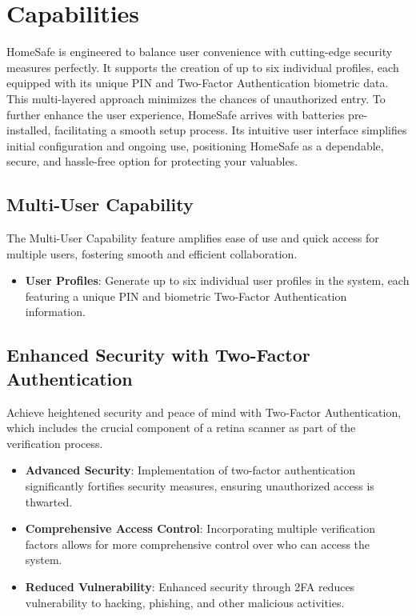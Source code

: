 \documentclass{article}
\begin{document}
\section{Capabilities}
HomeSafe is engineered to balance user convenience with cutting-edge security measures perfectly. It supports the creation of up to six individual profiles, each equipped with its unique PIN and Two-Factor Authentication biometric data. This multi-layered approach minimizes the chances of unauthorized entry. To further enhance the user experience, HomeSafe arrives with batteries pre-installed, facilitating a smooth setup process. Its intuitive user interface simplifies initial configuration and ongoing use, positioning HomeSafe as a dependable, secure, and hassle-free option for protecting your valuables.

\subsection{Multi-User Capability}
The Multi-User Capability feature amplifies ease of use and quick access for multiple users, fostering smooth and efficient collaboration.

\begin{itemize}
    \item \textbf{User Profiles}: Generate up to six individual user profiles in the system, each featuring a unique PIN and biometric Two-Factor Authentication information.
\end{itemize}

\subsection{Enhanced Security with Two-Factor Authentication}
Achieve heightened security and peace of mind with Two-Factor Authentication, which includes the crucial component of a retina scanner as part of the verification process.

\begin{itemize}
    \item \textbf{Advanced Security}: Implementation of two-factor authentication significantly fortifies security measures, ensuring unauthorized access is thwarted.
    \item \textbf{Comprehensive Access Control}: Incorporating multiple verification factors allows for more comprehensive control over who can access the system.
    \item \textbf{Reduced Vulnerability}: Enhanced security through 2FA reduces vulnerability to hacking, phishing, and other malicious activities.
\end{itemize}
\end{document}
